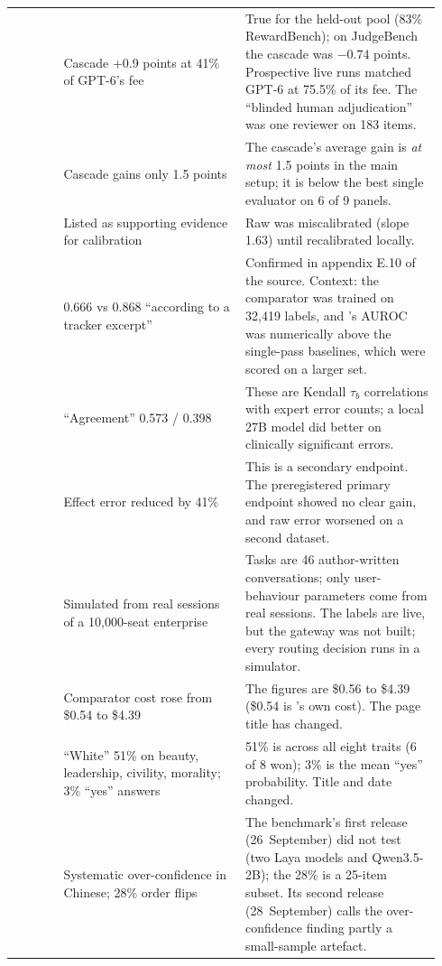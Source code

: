 \begin{longtable}{@{}p{0.11\linewidth}p{0.40\linewidth}p{0.43\linewidth}@{}}
\cite{arx26550} & Cascade +0.9 points at 41\% of GPT-6's fee & True for the held-out pool (83\% RewardBench); on JudgeBench the cascade was $-0.74$ points. Prospective live runs matched GPT-6 at 75.5\% of its fee. The ``blinded human adjudication'' was one reviewer on 183 items. \\
\cite{arx29769} & Cascade gains only 1.5 points & The cascade's average gain is \emph{at most} 1.5 points in the main setup; it is below the best single evaluator on 6 of 9 panels. \\
\cite{arx24052} & Listed as supporting evidence for calibration & Raw \jev{} was miscalibrated (slope 1.63) until recalibrated locally. \\
\cite{arx24881} & 0.666 vs 0.868 ``according to a tracker excerpt'' & Confirmed in appendix E.10 of the source. Context: the comparator was trained on 32{,}419 labels, and \jev{}'s AUROC was numerically above the single-pass baselines, which were scored on a larger set. \\
\cite{arx27607} & ``Agreement'' 0.573 / 0.398 & These are Kendall $\tau_b$ correlations with expert error counts; a local 27B model did better on clinically significant errors. \\
\cite{arx27535} & Effect error reduced by 41\% & This is a secondary endpoint. The preregistered primary endpoint showed no clear gain, and raw error worsened on a second dataset. \\
\cite{arx28919} & Simulated from real sessions of a 10{,}000-seat enterprise & Tasks are 46 author-written conversations; only user-behaviour parameters come from real sessions. The \jev{} labels are live, but the gateway was not built; every routing decision runs in a simulator. \\
\cite{checkpoint2026jev} & Comparator cost rose from \$0.54 to \$4.39 & The figures are \$0.56 to \$4.39 (\$0.54 is \jev{}'s own cost). The page title has changed. \\
\cite{simmons2026saidno} & ``White'' 51\% on beauty, leadership, civility, morality; 3\% ``yes'' answers & 51\% is across all eight traits (6 of 8 won); 3\% is the mean ``yes'' probability. Title and date changed. \\
\cite{qin2026zhdecisionbench} & Systematic over-confidence in Chinese; 28\% order flips & The benchmark's first release (26~September) did not test \jev{} (two Laya models and Qwen3.5-2B); the 28\% is a 25-item subset. Its second release (28~September) calls the over-confidence finding partly a small-sample artefact. \\

\end{longtable}
